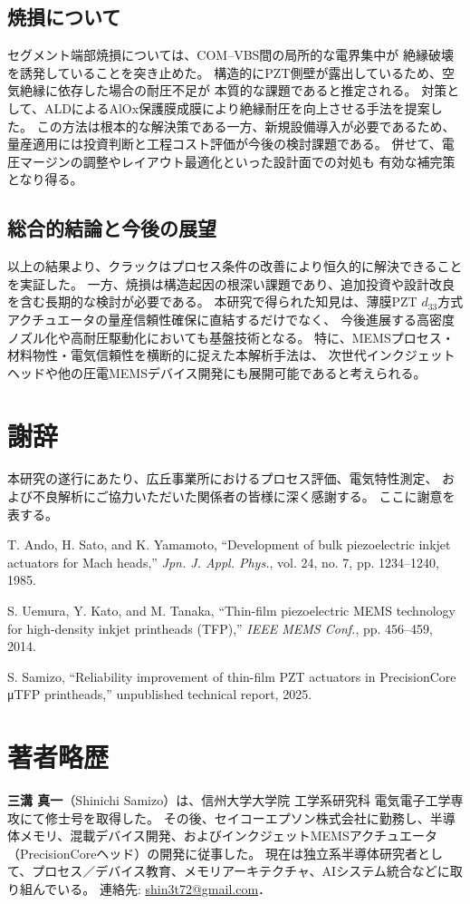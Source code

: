 \documentclass[conference]{IEEEtran}
\begin{document}
\subsection{焼損について}
セグメント端部焼損については、COM--VBS間の局所的な電界集中が
絶縁破壊を誘発していることを突き止めた。
構造的にPZT側壁が露出しているため、空気絶縁に依存した場合の耐圧不足が
本質的な課題であると推定される。
対策として、ALDによるAlOx保護膜成膜により絶縁耐圧を向上させる手法を提案した。
この方法は根本的な解決策である一方、新規設備導入が必要であるため、
量産適用には投資判断と工程コスト評価が今後の検討課題である。
併せて、電圧マージンの調整やレイアウト最適化といった設計面での対処も
有効な補完策となり得る。

\subsection{総合的結論と今後の展望}
以上の結果より、クラックはプロセス条件の改善により恒久的に解決できることを実証した。
一方、焼損は構造起因の根深い課題であり、追加投資や設計改良を含む長期的な検討が必要である。
本研究で得られた知見は、薄膜PZT $d_{33}$方式アクチュエータの量産信頼性確保に直結するだけでなく、
今後進展する高密度ノズル化や高耐圧駆動化においても基盤技術となる。
特に、MEMSプロセス・材料物性・電気信頼性を横断的に捉えた本解析手法は、
次世代インクジェットヘッドや他の圧電MEMSデバイス開発にも展開可能であると考えられる。

\section*{謝辞}
本研究の遂行にあたり、広丘事業所におけるプロセス評価、電気特性測定、  
および不良解析にご協力いただいた関係者の皆様に深く感謝する。  
ここに謝意を表する。

\begin{thebibliography}{99}

T. Ando, H. Sato, and K. Yamamoto, 
``Development of bulk piezoelectric inkjet actuators for Mach heads,'' 
\textit{Jpn. J. Appl. Phys.}, vol. 24, no. 7, pp. 1234--1240, 1985.

S. Uemura, Y. Kato, and M. Tanaka, 
``Thin-film piezoelectric MEMS technology for high-density inkjet printheads (TFP),'' 
\textit{IEEE MEMS Conf.}, pp. 456--459, 2014.

S. Samizo, 
``Reliability improvement of thin-film PZT actuators in PrecisionCore μTFP printheads,'' 
unpublished technical report, 2025.

\end{thebibliography}

\section*{著者略歴}
\textbf{三溝 真一}（Shinichi Samizo）は、信州大学大学院 工学系研究科 電気電子工学専攻にて修士号を取得した。  
その後、セイコーエプソン株式会社に勤務し、半導体メモリ、混載デバイス開発、およびインクジェットMEMSアクチュエータ（PrecisionCoreヘッド）の開発に従事した。  
現在は独立系半導体研究者として、プロセス／デバイス教育、メモリアーキテクチャ、AIシステム統合などに取り組んでいる。  
連絡先: \href{mailto:shin3t72@gmail.com}{shin3t72@gmail.com}．
\end{document}
